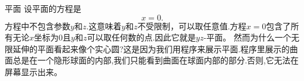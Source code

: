 ﻿\begin{surferPage}{平面}
设平面的方程是\[x=0.\]方程中不包含参数$y$和$z$.这意味着$y$和$z$不受限制，可以取任意值.方程$x=0$包含了所有无论$x$坐标为0且$y$和$z$可以取任何数的点.因此它就是$yz$-平面。
\newline \newline
然而为什么一个无限延伸的平面看起来像个实心圆?这是因为我们用程序来展示平面.程序里展示的曲面总是在一个隐形球面的内部,我们只能看到曲面在球面内部的部分.否则,它无法在屏幕显示出来。
\end{surferPage}

